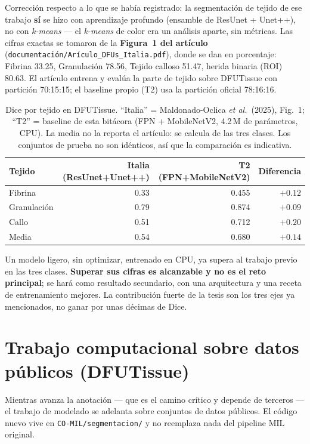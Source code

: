 \documentclass[12pt,letterpaper]{report}
\begin{document}
Corrección respecto a lo que se había registrado: la segmentación de tejido de ese trabajo
\textbf{sí} se hizo con aprendizaje profundo (ensamble de ResUnet + Unet++), no con \emph{k-means} ---
el \emph{k-means} de color era un análisis aparte, sin métricas. Las cifras exactas se tomaron de la
\textbf{Figura~1 del artículo} (\texttt{documentación/Arículo\_DFUs\_Italia.pdf}), donde se dan en
porcentaje: Fibrina 33.25, Granulación 78.56, Tejido calloso 51.47, herida binaria (ROI) 80.63. El
artículo entrena y evalúa la parte de tejido sobre DFUTissue con partición 70:15:15; el baseline
propio (T2) usa la partición oficial 78:16:16.

\begin{table}[H]
\centering
\caption{Dice por tejido en DFUTissue. ``Italia'' = Maldonado-Oclica \emph{et al.}\ (2025), Fig.~1;
``T2'' = baseline de esta bitácora (FPN + MobileNetV2, 4.2\,M de parámetros, CPU). La media no la
reporta el artículo: se calcula de las tres clases. Los conjuntos de prueba no son idénticos, así
que la comparación es indicativa.}
\begin{tabular}{lrrr}
\toprule
Tejido & Italia (ResUnet+Unet++) & T2 (FPN+MobileNetV2) & Diferencia \\
\midrule
Fibrina     & 0.33 & 0.455 & $+0.12$ \\
Granulación & 0.79 & 0.874 & $+0.09$ \\
Callo       & 0.51 & 0.712 & $+0.20$ \\
\midrule
Media       & 0.54 & 0.680 & $+0.14$ \\
\bottomrule
\end{tabular}
\end{table}

Un modelo ligero, sin optimizar, entrenado en CPU, ya supera al trabajo previo en las tres clases.
\textbf{Superar sus cifras es alcanzable y no es el reto principal}; se hará como resultado
secundario, con una arquitectura y una receta de entrenamiento mejores. La contribución fuerte de la
tesis son los tres ejes ya mencionados, no ganar por unas décimas de Dice.

\section{Trabajo computacional sobre datos públicos (DFUTissue)}

Mientras avanza la anotación --- que es el camino crítico y depende de terceros --- el trabajo de
modelado se adelanta sobre conjuntos de datos públicos. El código nuevo vive en
\texttt{CO-MIL/segmentacion/} y no reemplaza nada del pipeline MIL original.
\end{document}
